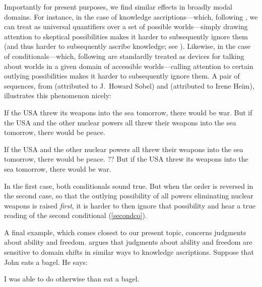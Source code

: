 \documentclass{salt}
\newcommand{\reff}[1]{(\ref{#1})}
\begin{document}
 Importantly for present purposes, we find similar effects in broadly modal domains. For instance, in the case of knowledge ascriptions---which, following \citealt{Hintikka62}, we can treat as universal quantifiers over a set of possible worlds---simply drawing attention to skeptical possibilities makes it harder to subsequently ignore them (and  thus harder to subsequently ascribe knowledge; see \citealt{DeRose1991,Lewis1996}). Likewise, in the case of conditionals---which, following \citealt{Stalnaker68, Lewis:1973,Kratzer:1981} are standardly treated as devices for talking about worlds in a given domain of accessible worlds---calling attention to certain outlying possibilities makes it harder to subsequently ignore them. A pair of sequences, from \citealt{Lewis:1973} (attributed to J.\ Howard Sobel) and \citealt{vonFintelCIDE} (attributed to Irene Heim), illustrates this phenomenon nicely: 
 
 \begin{exe}\ex\begin{xlist} \label{rf1}\ex\label{10} If the USA threw its weapons into the sea tomorrow, there would be war. \ex \label{11} But if the USA and the other nuclear powers all threw their weapons into the sea tomorrow, there would be peace.\end{xlist}\end{exe}
 
  \begin{exe}\ex\begin{xlist}\ex  If the USA and the other nuclear powers all threw their weapons into the sea tomorrow, there would be peace. \ex ?? But if the USA threw its weapons into the sea tomorrow, there would be war. \label{secondco}\end{xlist}\end{exe}
 
\noindent In the first case, both conditionals sound true. But when the order is reversed in the second case, so that the outlying possibility of all powers eliminating nuclear weapons is raised \emph{first}, it is harder to then ignore that possibility and hear a true reading of the second conditional \reff{secondco}.
  
 A final example, which comes closest to our present topic, concerns judgments about ability and freedom. \citet{Hawthorne:2001} argues that judgments about ability and freedom are sensitive to domain shifts in similar ways to knowledge ascriptions. Suppose that John eats a bagel. He says: 
 
 \begin{exe}\ex I was able to do otherwise than eat a bagel.\label{able}\end{exe}
 
\end{document}
